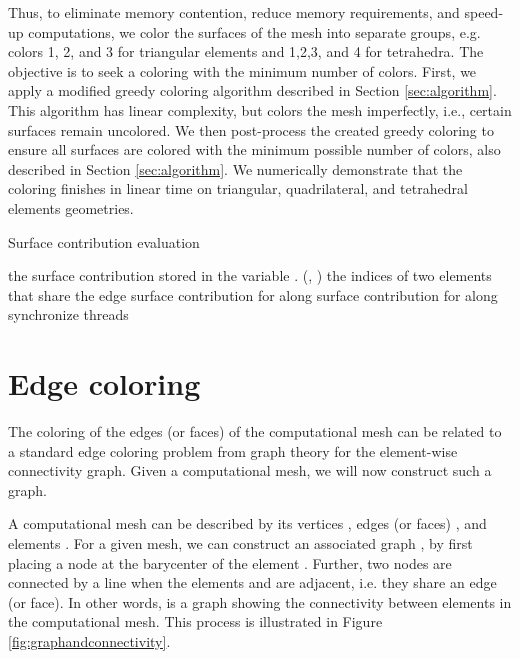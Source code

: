\documentclass[12pt]{article}
\begin{document}
Thus, to eliminate memory contention, reduce memory requirements, and speed-up computations, we color the surfaces of the mesh into separate groups, e.g. colors 1, 2, and 3 for triangular elements and 1,2,3, and 4 for tetrahedra.  The objective is to seek a coloring with the minimum number of colors.  First, we apply a modified greedy coloring algorithm described in Section \ref{sec:algorithm}.  This algorithm has linear complexity, but colors the mesh imperfectly, i.e., certain surfaces remain uncolored.  We then post-process the created greedy coloring to ensure all surfaces are colored with the minimum possible number of colors, also described in Section \ref{sec:algorithm}.  We numerically demonstrate that the coloring finishes in linear time on triangular, quadrilateral, and tetrahedral elements geometries.

\begin{algorithm}
	\caption{Surface contribution evaluation}  \label{alg:fluxeval}
	\begin{algorithmic}
		\Ensure the surface contribution stored in the variable . 
		\For{}
		\State (, )  the indices of two elements that share the edge 
		\For{}
		\State  surface contribution for  along 
		\State  surface contribution for  along 
		\EndFor
		\EndFor
		\State synchronize threads
		\EndFor
		
		\EndProcedure
	\end{algorithmic}  
\end{algorithm}




\section{Edge coloring}

The coloring of the edges (or faces) of the computational mesh can be related to a standard edge coloring problem from graph theory for the element-wise connectivity graph.  Given a computational mesh, we will now construct such a graph.

A computational mesh  can be described by its vertices , edges (or faces) , and elements .  For a given mesh, we can construct an associated graph , by first placing a node  at the barycenter of the element .  Further, two nodes  are connected by a line  when the elements  and  are adjacent, i.e. they share an edge (or face).  In other words,  is a graph showing the connectivity between elements in the computational mesh.  This process is illustrated in Figure \ref{fig:graphandconnectivity}.
\end{document}
